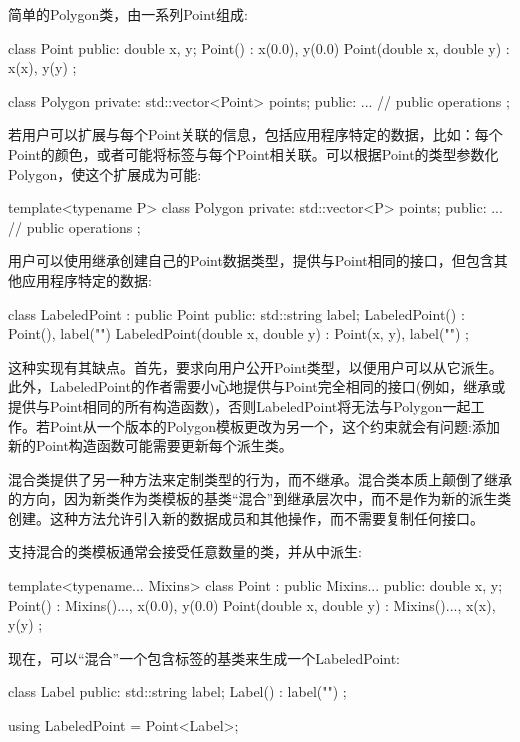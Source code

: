 
简单的Polygon类，由一系列Point组成:

\begin{cpp}
class Point
{
	public:
	double x, y;
	Point() : x(0.0), y(0.0) { }
	Point(double x, double y) : x(x), y(y) { }
};

class Polygon
{
	private:
	std::vector<Point> points;
	public:
	... // public operations
};
\end{cpp}

若用户可以扩展与每个Point关联的信息，包括应用程序特定的数据，比如：每个Point的颜色，或者可能将标签与每个Point相关联。可以根据Point的类型参数化Polygon，使这个扩展成为可能:

\begin{cpp}
template<typename P>
class Polygon
{
	private:
	std::vector<P> points;
	public:
	... // public operations
};
\end{cpp}

用户可以使用继承创建自己的Point数据类型，提供与Point相同的接口，但包含其他应用程序特定的数据:

\begin{cpp}
class LabeledPoint : public Point
{
	public:
	std::string label;
	LabeledPoint() : Point(), label("") { }
	LabeledPoint(double x, double y) : Point(x, y), label("") { }
};
\end{cpp}

这种实现有其缺点。首先，要求向用户公开Point类型，以便用户可以从它派生。此外，LabeledPoint的作者需要小心地提供与Point完全相同的接口(例如，继承或提供与Point相同的所有构造函数)，否则LabeledPoint将无法与Polygon一起工作。若Point从一个版本的Polygon模板更改为另一个，这个约束就会有问题:添加新的Point构造函数可能需要更新每个派生类。

混合类提供了另一种方法来定制类型的行为，而不继承。混合类本质上颠倒了继承的方向，因为新类作为类模板的基类“混合”到继承层次中，而不是作为新的派生类创建。这种方法允许引入新的数据成员和其他操作，而不需要复制任何接口。

支持混合的类模板通常会接受任意数量的类，并从中派生:

\begin{cpp}
template<typename... Mixins>
class Point : public Mixins...
{
	public:
	double x, y;
	Point() : Mixins()..., x(0.0), y(0.0) { }
	Point(double x, double y) : Mixins()..., x(x), y(y) { }
};
\end{cpp}

现在，可以“混合”一个包含标签的基类来生成一个LabeledPoint:

\begin{cpp}
class Label
{
	public:
	std::string label;
	Label() : label("") { }
};

using LabeledPoint = Point<Label>;
\end{cpp}

